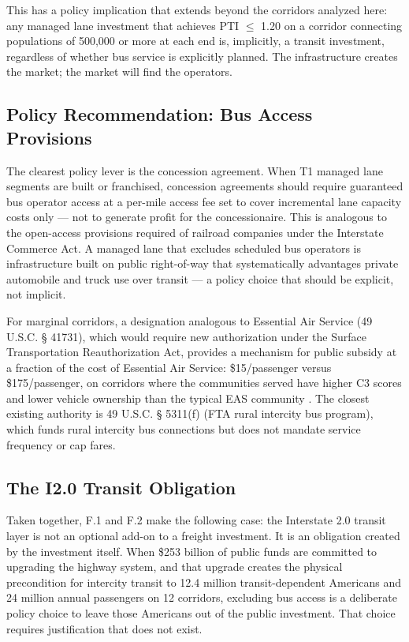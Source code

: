 This has a policy implication that extends beyond the corridors analyzed here: any managed lane investment that achieves PTI $\leq$ 1.20 on a corridor connecting populations of 500,000 or more at each end is, implicitly, a transit investment, regardless of whether bus service is explicitly planned. The infrastructure creates the market; the market will find the operators.

\subsection{Policy Recommendation: Bus Access Provisions}

The clearest policy lever is the concession agreement. When T1 managed lane segments are built or franchised, concession agreements should require guaranteed bus operator access at a per-mile access fee set to cover incremental lane capacity costs only --- not to generate profit for the concessionaire. This is analogous to the open-access provisions required of railroad companies under the Interstate Commerce Act. A managed lane that excludes scheduled bus operators is infrastructure built on public right-of-way that systematically advantages private automobile and truck use over transit --- a policy choice that should be explicit, not implicit.

For marginal corridors, a designation analogous to Essential Air Service (49 U.S.C. § 41731), which would require new authorization under the Surface Transportation Reauthorization Act, provides a mechanism for public subsidy at a fraction of the cost of Essential Air Service: \$15/passenger versus \$175/passenger, on corridors where the communities served have higher C3 scores and lower vehicle ownership than the typical EAS community \citep{EAS_DOT2023, ACS_B08201_2022}. The closest existing authority is 49 U.S.C. § 5311(f) (FTA rural intercity bus program), which funds rural intercity bus connections but does not mandate service frequency or cap fares.

\subsection{The I2.0 Transit Obligation}

Taken together, F.1 \citep{ROUTE_F1} and F.2 make the following case: the Interstate 2.0 transit layer is not an optional add-on to a freight investment. It is an obligation created by the investment itself. When \$253 billion of public funds are committed to upgrading the highway system, and that upgrade creates the physical precondition for intercity transit to 12.4 million transit-dependent Americans \citep{ROUTE_F1} and 24 million annual passengers on 12 corridors, excluding bus access is a deliberate policy choice to leave those Americans out of the public investment. That choice requires justification that does not exist.

